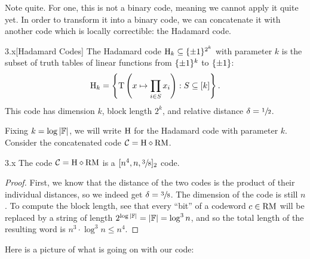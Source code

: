 \documentclass[11pt]{article}
\begin{document}
Note quite. For one, this is not a binary code, meaning we cannot apply it quite yet. In order to transform it into a binary code, we can concatenate it with another code which is locally correctible: the Hadamard code.

\begin{definition}{3.x}[Hadamard Codes]
    The Hadamard code $\mathrm{H}_k \subseteq \{\pm 1\}^{2^k}$ with parameter $k$ is the subset of truth tables of linear functions from $\{\pm 1\}^k$ to $\{\pm 1\}$:
    \begin{equation*}
        \mathrm{H}_k = \left\{\mathrm{T}\left(x \mapsto \prod_{i \in S} x_i\right) : S \subseteq [k]\right\}.
    \end{equation*} 
    This code has dimension $k$, block length $2^k$, and relative distance $\delta = \sfrac{1}{2}$.
\end{definition}

Fixing $k = \log |\mathbb{F}|$, we will write $\mathrm{H}$ for the Hadamard code with parameter $k$. Consider the concatenated code $\mathcal{C} = \mathrm{H} \diamond \mathrm{RM}$. 

\begin{claim}{3.x}
    The code $\mathcal{C} = \mathrm{H} \diamond \mathrm{RM}$ is a $[n^4, n, \sfrac{3}{8}]_2$ code.
\end{claim}

\begin{proof}
    First, we know that the distance of the two codes is the product of their individual distances, so we indeed get $\delta = \sfrac{3}{8}$. The dimension of the code is still $n$. To compute the block length, see that every ``bit'' of a codeword $c \in \mathrm{RM}$ will be replaced by a string of length $2^{\log |\mathbb{F}|} = |\mathbb{F}| = \log^3 n$, and so the total length of the resulting word is $n^3 \cdot \log^3 n \leq n^4$.
\end{proof}

Here is a picture of what is going on with our code:
\end{document}
